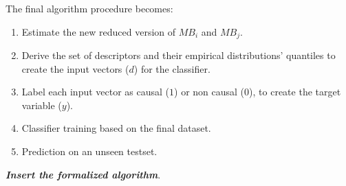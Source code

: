 The final algorithm procedure becomes: 
\begin{enumerate}
    \item Estimate the new reduced version of $MB_i$ and $MB_j$.
    \item Derive the set of descriptors and their empirical distributions' quantiles to create the input vectors ($d$) for the classifier.
    \item Label each input vector as causal ($1$) or non causal ($0$), to create the target variable ($y$).
    \item Classifier training based on the final dataset.
    \item Prediction on an unseen testset.
\end{enumerate}

\textbf{\textit{Insert the formalized algorithm}}.


